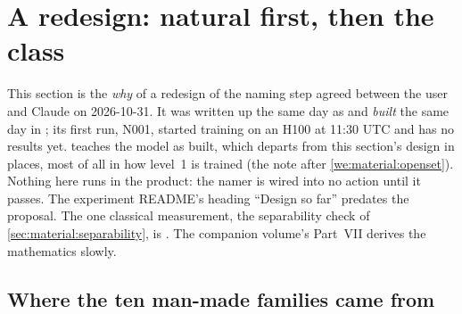 \section{A redesign: natural first, then the class}\label{sec:material:twolevel}

\begin{sourcenote}
This section is the \emph{why} of a redesign of the naming step agreed between the user and Claude on 2026-10-31.
It was written up the same day as  and \emph{built} the same day in
; its first run, N001, started training on an H100 at 11:30 UTC and has no results
yet.  teaches the model as built, which departs from this section's design in places, most of all in
how level~1 is trained (the note after \cref{we:material:openset}). Nothing here runs in the product: the namer is
wired into no action until it passes. The experiment README's heading ``Design so far'' predates the proposal.
The one classical measurement, the separability check of \cref{sec:material:separability}, is
. The companion volume's Part~VII derives the
mathematics slowly.
\end{sourcenote}

\subsection{Where the ten man-made families came from}

